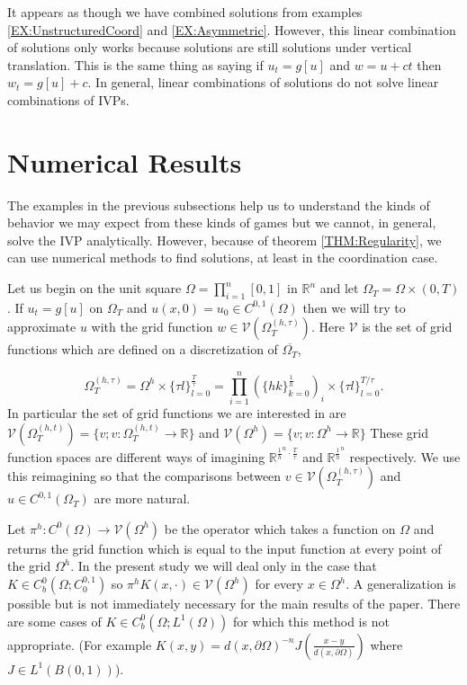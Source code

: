 \documentclass[aps,
preprint,
groupedaddress,
showkeys,
amsmath]{revtex4-2}
\begin{document}
    It appears as though we have combined solutions from examples \ref{EX:UnstructuredCoord} and \ref{EX:Asymmetric}. However, this linear combination of solutions only works because solutions are still solutions under vertical translation. This is the same thing as saying if $u_t=g[u]$ and $w=u+ct$ then $w_t=g[u]+c$. In general, linear combinations of solutions do not solve linear combinations of IVPs. 
    
\section{Numerical Results}\label{SEC:NumericalResults}
    The examples in the previous subsections help us to understand the kinds of behavior we may expect from these kinds of games but we cannot, in general, solve the IVP analytically. However, because of theorem \ref{THM:Regularity}, we can use numerical methods to find solutions, at least in the coordination case. 

    Let us begin on the unit square $\Omega=\prod_{i=1}^n[0,1]$ in $\mathbb{R}^n$ and let $\Omega_T=\Omega\times(0,T)$. If $u_t=g[u]$ on $\Omega_T$ and $u(x,0)=u_0\in C^{0,1}(\Omega)$ then we will try to approximate $u$ with the grid function $w\in \mathcal{V}(\Omega_T^{(h,\tau)})$. Here $\mathcal{V}$ is the set of grid functions which are defined on a discretization of $\overline{\Omega_T}$, 
    
    \begin{equation}\label{hypercube}
    \Omega_T^{(h,\tau)}=\Omega^{h}\times \{\tau l\}_{l=0}^\frac{T}{\tau}=\prod_{i=1}^n\left(\{hk\}_{k=0}^\frac{1}{h}\right)_i\times \{\tau l\}_{l=0}^{T/\tau}.
    \end{equation}
    In particular the set of grid functions we are interested in are $\mathcal{V}(\Omega^{(h,t)}_T)=\{v; v:\Omega^{(h,t)}_T\rightarrow \mathbb{R}\}$ and $\mathcal{V}(\Omega^h)=\{v;v:\Omega^h\to \mathbb{R}\}$ These grid function spaces are different ways of imagining $\mathbb{R}^{\frac{1}{h}^n\cdot \frac{T}{\tau}}$ and $\mathbb{R}^{\frac{1}{h}^n}$ respectively. We use this reimagining so that the comparisons between $v\in \mathcal{V}(\Omega^{(h,\tau)}_T)$ and $u\in C^{0,1}(\Omega_T)$ are more natural. 
    
    Let $\pi^h:C^{0}(\Omega)\rightarrow \mathcal{V}(\Omega^h)$ be the operator which takes a function on $\Omega$ and returns the grid function which is equal to the input function at every point of the grid $\Omega^h$. In the present study we will deal only in the case that $K\in C^0_b(\Omega;C^{0,1}_0)$ so $\pi^hK(x,\cdot)\in \mathcal{V}(\Omega^h)$ for every $x\in \Omega^h$. A generalization is possible but is not immediately necessary for the main results of the paper. There are some cases of $K\in C^0_b(\Omega;L^1(\Omega))$ for which this method is not appropriate. (For example $K(x,y)=d(x,\partial \Omega)^{-n}J(\frac{x-y}{d(x,\partial\Omega)})$ where $J\in L^1(B(0,1))$).
\end{document}

